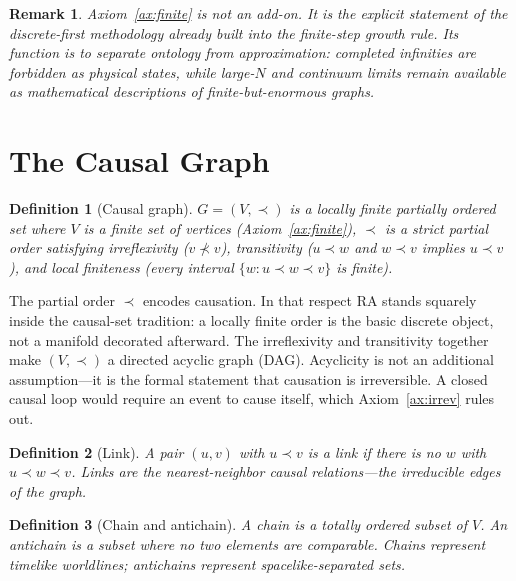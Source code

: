 \documentclass[11pt]{article}
\newtheorem{definition}{Definition}
\newtheorem{remark}{Remark}
\begin{document}
\begin{remark}
Axiom~\ref{ax:finite} is not an add-on. It is the explicit statement of the discrete-first methodology already built into the finite-step growth rule. Its function is to separate ontology from approximation: completed infinities are forbidden as physical states, while large-$N$ and continuum limits remain available as mathematical descriptions of finite-but-enormous graphs.
\end{remark}

\section{The Causal Graph}
\label{sec:graph}

\begin{definition}[Causal graph]
$G=(V,\prec)$ is a locally finite partially ordered set where $V$ is a finite set of vertices (Axiom~\ref{ax:finite}), $\prec$ is a strict partial order satisfying irreflexivity ($v\not\prec v$), transitivity ($u\prec w$ and $w\prec v$ implies $u\prec v$), and local finiteness (every interval $\{w:u\prec w\prec v\}$ is finite).
\end{definition}

The partial order $\prec$ encodes causation. In that respect RA stands squarely inside the causal-set tradition: a locally finite order is the basic discrete object, not a manifold decorated afterward. The irreflexivity and transitivity together make $(V,\prec)$ a directed acyclic graph (DAG). Acyclicity is not an additional assumption---it is the formal statement that causation is irreversible. A closed causal loop would require an event to cause itself, which Axiom~\ref{ax:irrev} rules out.

\begin{definition}[Link]
A pair $(u,v)$ with $u\prec v$ is a \emph{link} if there is no $w$ with $u\prec w\prec v$. Links are the nearest-neighbor causal relations---the irreducible edges of the graph.
\end{definition}

\begin{definition}[Chain and antichain]
A \emph{chain} is a totally ordered subset of $V$. An \emph{antichain} is a subset where no two elements are comparable. Chains represent timelike worldlines; antichains represent spacelike-separated sets.
\end{definition}
\end{document}
